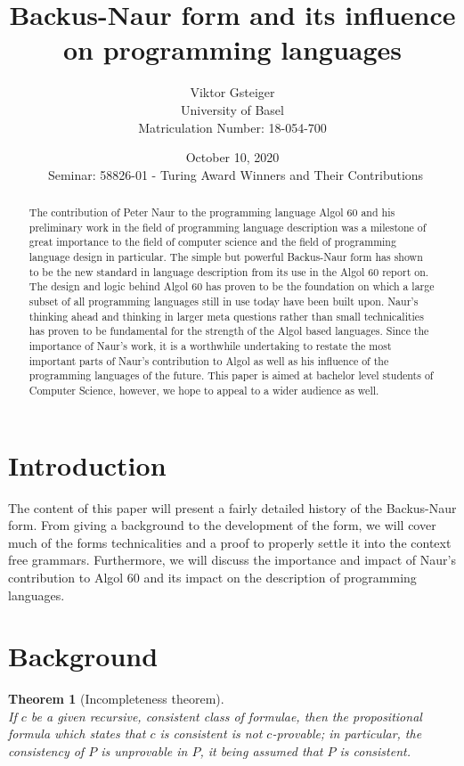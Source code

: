 \documentclass{article}
\author{Viktor Gsteiger \\ University of Basel \\ Matriculation Number: 18-054-700}
\title{Backus-Naur form and its influence on programming languages}
\date{October 10, 2020 \\\ Seminar: 58826-01 - Turing Award Winners and Their Contributions}
\newtheorem{theorem}{Theorem}
\begin{document}
\maketitle

\begin{abstract}
	The contribution of Peter Naur to the programming language Algol 60 and his preliminary work in the field of programming language description was a milestone of great importance to the field of computer science and the field of programming language design in particular. The simple but powerful Backus-Naur form has shown to be the new standard in language description from its use in the Algol 60 report on. The design and logic behind Algol 60 has proven to be the foundation on which a large subset of all programming languages still in use today have been built upon. Naur's thinking ahead and thinking in larger meta questions rather than small technicalities has proven to be fundamental for the strength of the Algol based languages. Since the importance of Naur's work, it is a worthwhile undertaking to restate the most important parts of Naur's contribution to Algol as well as his influence of the programming languages of the future. This paper is aimed at bachelor level students of Computer Science, however, we hope to appeal to a wider audience as well.
\end{abstract}

\newpage

\section{Introduction}
The content of this paper will present a fairly detailed history of the Backus-Naur form. From giving a background to the development of the form, we will cover much of the forms technicalities and a proof to properly settle it into the context free grammars. Furthermore, we will discuss the importance and impact of Naur's contribution to Algol 60 and its impact on the description of programming languages.


\section{Background}


\begin{theorem}[Incompleteness theorem]~\\
    If $c$ be a given recursive, consistent class of formulae, then the
    propositional formula which states that $c$ is consistent is not
    $c$-provable; in particular, the consistency of $P$ is unprovable in $P$, it
    being assumed that $P$ is consistent.
\end{theorem}
\end{document}
